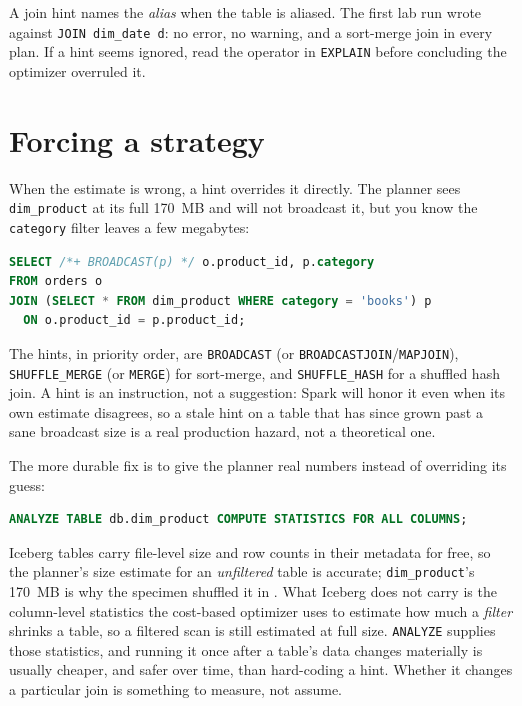 \begin{warning}
A join hint names the \emph{alias} when the table is aliased. The first lab run wrote
 against \texttt{JOIN dim\_date d}: no error, no
warning, and a sort-merge join in every plan. If a hint seems ignored, read the
operator in \texttt{EXPLAIN} before concluding the optimizer overruled it.
\end{warning}

\section{Forcing a strategy}
\label{sec:joins-forcing}

When the estimate is wrong, a hint overrides it directly. The planner sees
\texttt{dim\_product} at its full 170~MB and will not broadcast it, but you know
the \texttt{category} filter leaves a few megabytes:

\begin{lstlisting}[language=SQL,caption={Forcing a broadcast of a filtered dimension},captionpos=b,label=lst:joins-hint]
SELECT /*+ BROADCAST(p) */ o.product_id, p.category
FROM orders o
JOIN (SELECT * FROM dim_product WHERE category = 'books') p
  ON o.product_id = p.product_id;
\end{lstlisting}

The hints, in priority order, are \texttt{BROADCAST} (or
\texttt{BROADCASTJOIN}/\texttt{MAPJOIN}), \texttt{SHUFFLE\_MERGE} (or
\texttt{MERGE}) for sort-merge, and \texttt{SHUFFLE\_HASH} for a shuffled hash
join. A hint is an instruction, not a suggestion: Spark will honor it even when
its own estimate disagrees, so a stale hint on a table that has since grown
past a sane broadcast size is a real production hazard, not a theoretical one.

The more durable fix is to give the planner real numbers instead of overriding
its guess:

\begin{lstlisting}[language=SQL,caption={Giving the CBO real statistics},captionpos=b]
ANALYZE TABLE db.dim_product COMPUTE STATISTICS FOR ALL COLUMNS;
\end{lstlisting}

Iceberg tables carry file-level size and row counts in their metadata for free,
so the planner's size estimate for an \emph{unfiltered} table is accurate;
\texttt{dim\_product}'s 170~MB is why the specimen shuffled it in
. What Iceberg does not carry is the column-level statistics
the cost-based optimizer uses to estimate how much a \emph{filter} shrinks a
table, so a filtered scan is still estimated at full size. \texttt{ANALYZE}
supplies those statistics, and running it once after a table's data changes
materially is usually cheaper, and safer over time, than hard-coding a hint.
Whether it changes a particular join is something to measure, not assume.

